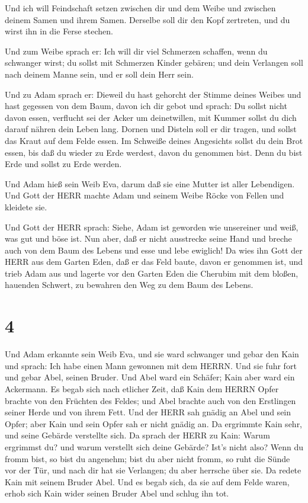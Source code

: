  Und ich will Feindschaft setzen zwischen dir und dem Weibe
und zwischen deinem Samen und ihrem Samen. Derselbe soll dir den Kopf
zertreten, und du wirst ihn in die Ferse stechen.

 Und zum Weibe sprach er: Ich will dir viel Schmerzen
schaffen, wenn du schwanger wirst; du sollst mit Schmerzen Kinder
gebären; und dein Verlangen soll nach deinem Manne sein, und er soll
dein Herr sein.

 Und zu Adam sprach er: Dieweil du hast gehorcht der Stimme
deines Weibes und hast gegessen von dem Baum, davon ich dir gebot und
sprach: Du sollst nicht davon essen, verflucht sei der Acker um
deinetwillen, mit Kummer sollst du dich darauf nähren dein Leben lang.
 Dornen und Disteln soll er dir tragen, und sollst das
Kraut auf dem Felde essen.  Im Schweiße deines Angesichts
sollst du dein Brot essen, bis daß du wieder zu Erde werdest, davon du
genommen bist. Denn du bist Erde und sollst zu Erde werden.

 Und Adam hieß sein Weib Eva, darum daß sie eine Mutter ist
aller Lebendigen.  Und Gott der HERR machte Adam und seinem
Weibe Röcke von Fellen und kleidete sie.

 Und Gott der HERR sprach: Siehe, Adam ist geworden wie
unsereiner und weiß, was gut und böse ist. Nun aber, daß er nicht
ausstrecke seine Hand und breche auch von dem Baum des Lebens und esse
und lebe ewiglich!  Da wies ihn Gott der HERR aus dem
Garten Eden, daß er das Feld baute, davon er genommen ist, 
und trieb Adam aus und lagerte vor den Garten Eden die Cherubim mit dem
bloßen, hauenden Schwert, zu bewahren den Weg zu dem Baum des Lebens.

\hypertarget{section-3}{%
\section{4}\label{section-3}}

 Und Adam erkannte sein Weib Eva, und sie ward schwanger und
gebar den Kain und sprach: Ich habe einen Mann gewonnen mit dem HERRN.
 Und sie fuhr fort und gebar Abel, seinen Bruder. Und Abel
ward ein Schäfer; Kain aber ward ein Ackermann.  Es begab
sich nach etlicher Zeit, daß Kain dem HERRN Opfer brachte von den
Früchten des Feldes;  und Abel brachte auch von den
Erstlingen seiner Herde und von ihrem Fett. Und der HERR sah gnädig an
Abel und sein Opfer;  aber Kain und sein Opfer sah er nicht
gnädig an. Da ergrimmte Kain sehr, und seine Gebärde verstellte sich.
 Da sprach der HERR zu Kain: Warum ergrimmst du? und warum
verstellt sich deine Gebärde?  Ist's nicht also? Wenn du
fromm bist, so bist du angenehm; bist du aber nicht fromm, so ruht die
Sünde vor der Tür, und nach dir hat sie Verlangen; du aber herrsche über
sie.  Da redete Kain mit seinem Bruder Abel. Und es begab
sich, da sie auf dem Felde waren, erhob sich Kain wider seinen Bruder
Abel und schlug ihn tot.

